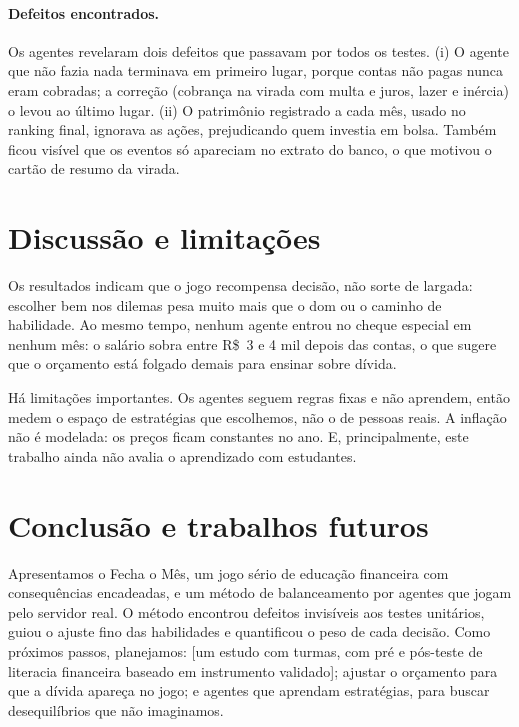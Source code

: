 \documentclass[11pt,a4paper]{article}
\begin{document}
\paragraph{Defeitos encontrados.} Os agentes revelaram dois defeitos que passavam por todos os testes. (i) O agente que não fazia nada terminava em primeiro lugar, porque contas não pagas nunca eram cobradas; a correção (cobrança na virada com multa e juros, lazer e inércia) o levou ao último lugar. (ii) O patrimônio registrado a cada mês, usado no ranking final, ignorava as ações, prejudicando quem investia em bolsa. Também ficou visível que os eventos só apareciam no extrato do banco, o que motivou o cartão de resumo da virada.

\section{Discussão e limitações}

Os resultados indicam que o jogo recompensa decisão, não sorte de largada: escolher bem nos dilemas pesa muito mais que o dom ou o caminho de habilidade. Ao mesmo tempo, nenhum agente entrou no cheque especial em nenhum mês: o salário sobra entre R\$~3 e 4 mil depois das contas, o que sugere que o orçamento está folgado demais para ensinar sobre dívida. %

Há limitações importantes. Os agentes seguem regras fixas e não aprendem, então medem o espaço de estratégias que escolhemos, não o de pessoas reais. A inflação não é modelada: os preços ficam constantes no ano. E, principalmente, este trabalho ainda não avalia o aprendizado com estudantes.

\section{Conclusão e trabalhos futuros}

Apresentamos o Fecha o Mês, um jogo sério de educação financeira com consequências encadeadas, e um método de balanceamento por agentes que jogam pelo servidor real. O método encontrou defeitos invisíveis aos testes unitários, guiou o ajuste fino das habilidades e quantificou o peso de cada decisão. Como próximos passos, planejamos: [um estudo com turmas, com pré e pós-teste de literacia financeira baseado em instrumento validado]; ajustar o orçamento para que a dívida apareça no jogo; e agentes que aprendam estratégias, para buscar desequilíbrios que não imaginamos. %



\end{document}
